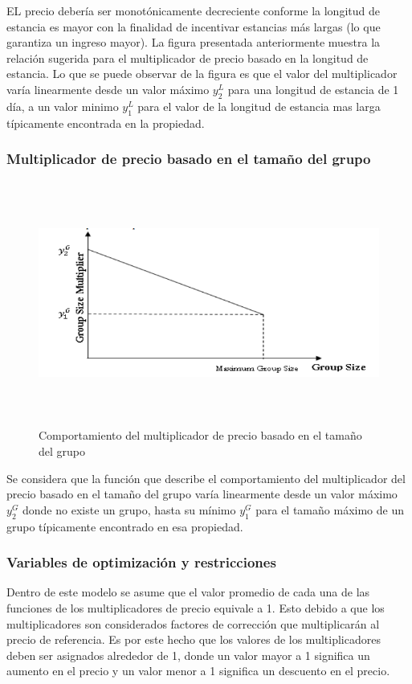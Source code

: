 {{{EL precio debería ser monotónicamente decreciente conforme la longitud de estancia es mayor con la finalidad de incentivar estancias más largas (lo que garantiza un ingreso mayor). La figura presentada anteriormente muestra la relación sugerida para el multiplicador de precio basado en la longitud de estancia. Lo que se puede observar de la figura es que el valor del multiplicador varía linearmente desde un valor máximo $y_2^L$ para una longitud de estancia de 1 día, a un valor minimo $y_1^L$ para el valor de la longitud de estancia mas larga típicamente encontrada en la propiedad.

\subsubsection*{Multiplicador de precio basado en el tamaño del grupo}

\begin{figure}[H]
  \centering
      \includegraphics[width=\maxwidth,height=8cm]{figures/Group_Mult.png} 
  \caption{Comportamiento del multiplicador de precio basado en el tamaño del grupo}
\end{figure}

Se considera que la función que describe el comportamiento del multiplicador del precio basado en el tamaño del grupo varía linearmente desde un valor máximo $y_2^G$ donde no existe un grupo, hasta su mínimo $y_1^G$ para el tamaño máximo de un grupo típicamente encontrado en esa propiedad.

\subsubsection*{Variables de optimización y restricciones}

Dentro de este modelo se asume que el valor promedio de cada una de las funciones de los multiplicadores de precio equivale a 1. Esto debido a que los multiplicadores son considerados factores de corrección que multiplicarán al precio de referencia. Es por este hecho que los valores de los multiplicadores deben ser asignados alrededor de 1, donde un valor mayor a 1 significa un aumento en el precio y un valor menor a 1 significa un descuento en el precio.

}}}
